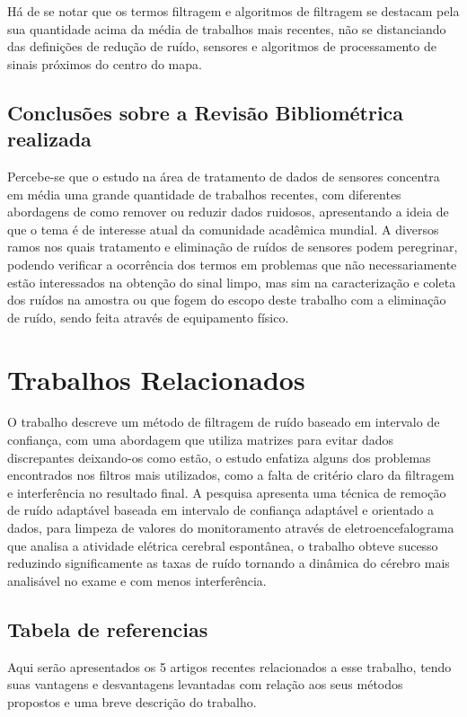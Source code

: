 Há de se notar que os termos filtragem e algoritmos de filtragem se destacam pela sua quantidade acima da média de trabalhos mais recentes, não se distanciando das definições de redução de ruído, sensores e algoritmos de processamento de sinais próximos do centro do mapa.
 


\subsection{Conclusões sobre a Revisão Bibliométrica realizada}
Percebe-se que o estudo na área de tratamento de dados de sensores concentra em média uma grande quantidade de trabalhos recentes, com diferentes abordagens de como remover ou reduzir dados ruidosos, apresentando a ideia de que o tema é de interesse atual da comunidade acadêmica mundial. A diversos ramos nos quais tratamento e eliminação de ruídos de sensores podem peregrinar, podendo verificar a ocorrência dos termos em problemas que não necessariamente estão interessados na obtenção do sinal limpo, mas sim na caracterização e coleta dos ruídos na amostra ou que fogem do escopo deste trabalho com a eliminação de ruído, sendo feita através de equipamento físico.



\section{Trabalhos Relacionados}%

O trabalho \cite{kalambet2011noise} descreve um método de filtragem de ruído baseado em intervalo de confiança, com uma abordagem que utiliza matrizes para evitar dados discrepantes deixando-os como estão, o estudo enfatiza alguns dos problemas encontrados nos filtros mais utilizados, como a falta de critério claro da filtragem e interferência no resultado final. A pesquisa \cite{madhale2020adaptive} apresenta uma técnica de remoção de ruído adaptável baseada em intervalo de confiança adaptável e orientado a dados, para limpeza de valores do monitoramento através de eletroencefalograma que analisa a atividade elétrica cerebral espontânea, o trabalho obteve sucesso reduzindo significamente as taxas de ruído tornando a dinâmica do cérebro mais analisável no exame e com menos interferência.

\subsection{Tabela de referencias}
Aqui serão apresentados os 5 artigos recentes relacionados a esse trabalho, tendo suas vantagens e desvantagens levantadas com relação aos seus métodos propostos e uma breve descrição do trabalho.

